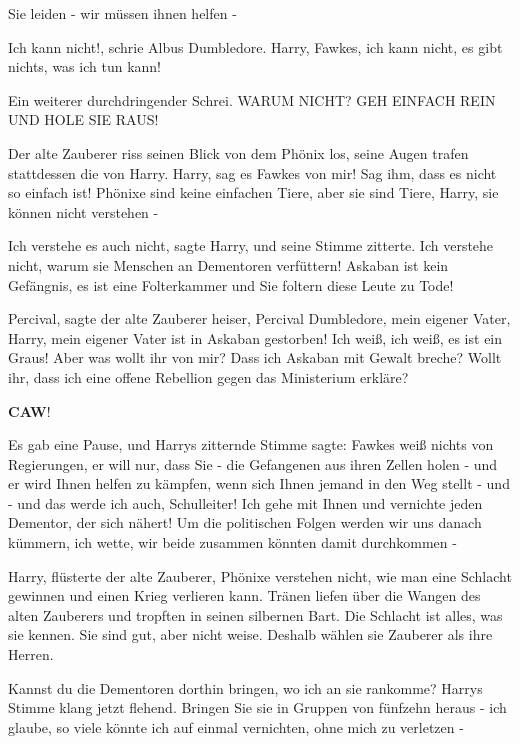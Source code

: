 \glqq Sie leiden - wir müssen ihnen helfen -\grqq{}

\glqq Ich kann nicht!\grqq{}, schrie Albus Dumbledore. \glqq Harry, Fawkes, ich
kann nicht, es gibt nichts, was ich tun kann!\grqq{}

Ein weiterer durchdringender Schrei. \glqq WARUM NICHT? GEH EINFACH REIN UND
HOLE SIE RAUS!\grqq{}

Der alte Zauberer riss seinen Blick von dem Phönix los, seine Augen trafen
stattdessen die von Harry. \glqq Harry, sag es Fawkes von mir! Sag ihm, dass es
nicht so einfach ist! Phönixe sind keine einfachen Tiere, aber sie sind Tiere,
Harry, sie können nicht verstehen -\grqq{}

\glqq Ich verstehe es auch nicht\grqq{}, sagte Harry, und seine Stimme zitterte.
\glqq Ich verstehe nicht, warum sie Menschen an Dementoren verfüttern! Askaban
ist kein Gefängnis, es ist eine Folterkammer und Sie foltern diese Leute zu
Tode!\grqq{}

\glqq Percival\grqq{}, sagte der alte Zauberer heiser, \glqq Percival
Dumbledore, mein eigener Vater, Harry, mein eigener Vater ist in Askaban
gestorben! Ich weiß, ich weiß, es ist ein Graus! Aber was wollt ihr von mir?
Dass ich Askaban mit Gewalt breche? Wollt ihr, dass ich eine offene Rebellion
gegen das Ministerium erkläre?\grqq{}

\textbf{CAW}!

Es gab eine Pause, und Harrys zitternde Stimme sagte: \glqq Fawkes weiß nichts
von Regierungen, er will nur, dass Sie - die Gefangenen aus ihren Zellen holen -
und er wird Ihnen helfen zu kämpfen, wenn sich Ihnen jemand in den Weg stellt -
und - und das werde ich auch, Schulleiter! Ich gehe mit Ihnen und vernichte
jeden Dementor, der sich nähert! Um die politischen Folgen werden wir uns danach
kümmern, ich wette, wir beide zusammen könnten damit durchkommen -\grqq{}

\glqq Harry\grqq{}, flüsterte der alte Zauberer, \glqq Phönixe verstehen nicht,
wie man eine Schlacht gewinnen und einen Krieg verlieren kann.\grqq{} Tränen
liefen über die Wangen des alten Zauberers und tropften in seinen silbernen
Bart. \glqq Die Schlacht ist alles, was sie kennen. Sie sind gut, aber nicht
weise. Deshalb wählen sie Zauberer als ihre Herren.\grqq{}

\glqq Kannst du die Dementoren dorthin bringen, wo ich an sie rankomme?\grqq{}
Harrys Stimme klang jetzt flehend. \glqq Bringen Sie sie in Gruppen von fünfzehn
heraus - ich glaube, so viele könnte ich auf einmal vernichten, ohne mich zu
verletzen -\grqq{}

